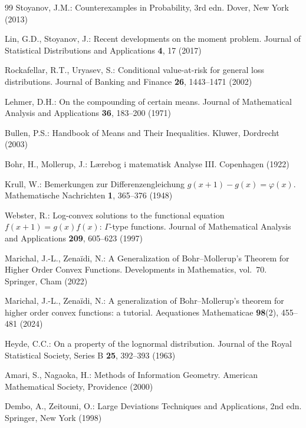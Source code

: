 \documentclass[sn-mathphys-num]{sn-jnl}
\theoremstyle{thmstyleone}%
\theoremstyle{thmstyletwo}%
\theoremstyle{thmstylethree}%
\theoremstyle{thmstyleone}%
\begin{document}
\begin{thebibliography}{99}
		Stoyanov, J.M.: Counterexamples in Probability, 3rd edn. Dover,
		New York (2013)
		
		Lin, G.D., Stoyanov, J.: Recent developments on the moment
		problem. Journal of Statistical Distributions and Applications
		\textbf{4}, 17 (2017)
		
		Rockafellar, R.T., Uryasev, S.: Conditional value-at-risk for
		general loss distributions. Journal of Banking and Finance
		\textbf{26}, 1443--1471 (2002)
		
		Lehmer, D.H.: On the compounding of certain means. Journal of
		Mathematical Analysis and Applications \textbf{36}, 183--200 (1971)
		
		Bullen, P.S.: Handbook of Means and Their Inequalities. Kluwer,
		Dordrecht (2003)
		
		Bohr, H., Mollerup, J.: L{\ae}rebog i matematisk Analyse III.
		Copenhagen (1922)
		
		Krull, W.: Bemerkungen zur Differenzengleichung
		$g(x+1)-g(x)=\varphi(x)$. Mathematische Nachrichten \textbf{1},
		365--376 (1948)
		
		Webster, R.: Log-convex solutions to the functional equation
		$f(x+1)=g(x)f(x)$: $\Gamma$-type functions. Journal of
		Mathematical Analysis and Applications \textbf{209}, 605--623
		(1997)
		
		Marichal, J.-L., Zena\"idi, N.: A Generalization of
		Bohr--Mollerup's Theorem for Higher Order Convex Functions.
		Developments in Mathematics, vol.~70. Springer, Cham (2022)
		
		Marichal, J.-L., Zena\"idi, N.: A generalization of
		Bohr--Mollerup's theorem for higher order convex functions: a
		tutorial. Aequationes Mathematicae \textbf{98}(2), 455--481 (2024)
		
		Heyde, C.C.: On a property of the lognormal distribution. Journal
		of the Royal Statistical Society, Series B \textbf{25}, 392--393
		(1963)
		
		Amari, S., Nagaoka, H.: Methods of Information Geometry. American
		Mathematical Society, Providence (2000)
		
		Dembo, A., Zeitouni, O.: Large Deviations Techniques and
		Applications, 2nd edn. Springer, New York (1998)
		

\end{thebibliography}
\end{document}
